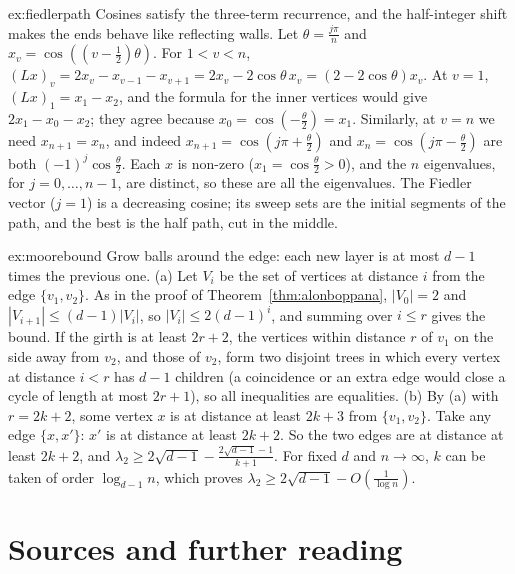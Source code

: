 \begin{solution}{ex:fiedlerpath}
\idea Cosines satisfy the three-term recurrence, and the half-integer shift makes the ends behave like reflecting walls.
\writeup Let $\theta=\frac{j\pi}n$ and $x_v=\cos((v-\frac12)\theta)$. For $1<v<n$, $(Lx)_v=2x_v-x_{v-1}-x_{v+1}=2x_v-2\cos\theta\,x_v=(2-2\cos\theta)x_v$. At $v=1$, $(Lx)_1=x_1-x_2$, and the formula for the
inner vertices would give $2x_1-x_0-x_2$; they agree because $x_0=\cos(-\frac\theta2)=x_1$. Similarly, at $v=n$ we need $x_{n+1}=x_n$, and indeed $x_{n+1}=\cos(j\pi+\frac\theta2)$ and $x_n=\cos(j\pi-\frac\theta2)$ are both $(-1)^j\cos\frac\theta2$. Each $x$
is non-zero ($x_1=\cos\frac\theta2>0$), and the $n$ eigenvalues, for $j=0,\dots,n-1$, are distinct, so these are all the eigenvalues. The Fiedler vector ($j=1$) is a decreasing cosine; its sweep sets are the initial segments of the path, and the best is the
half path, cut in the middle.
\end{solution}

\begin{solution}{ex:moorebound}
\idea Grow balls around the edge: each new layer is at most $d-1$ times the previous one.
\writeup (a) Let $V_i$ be the set of vertices at distance $i$ from the edge $\{v_1,v_2\}$. As in the proof of Theorem~\ref{thm:alonboppana}, $|V_0|=2$ and $|V_{i+1}|\le(d-1)|V_i|$, so $|V_i|\le2(d-1)^i$, and summing over
$i\le r$ gives the bound. If the girth is at least $2r+2$, the vertices within distance $r$ of $v_1$ on the side away from $v_2$, and those of $v_2$, form two disjoint trees in which every vertex at
distance $i<r$ has $d-1$ children (a coincidence or an extra edge would close a cycle of length at most $2r+1$), so all inequalities are equalities.
(b) By (a) with $r=2k+2$, some vertex $x$ is at distance at least $2k+3$ from $\{v_1,v_2\}$. Take any edge $\{x,x'\}$: $x'$ is at distance at least $2k+2$. So the two edges are at distance at least
$2k+2$, and $\lambda_2\ge2\sqrt{d-1}-\frac{2\sqrt{d-1}-1}{k+1}$. For fixed $d$ and $n\to\infty$, $k$ can be taken of order $\log_{d-1}n$, which proves $\lambda_2\ge2\sqrt{d-1}-O(\frac1{\log n})$.
\end{solution}

\section*{Sources and further reading}


